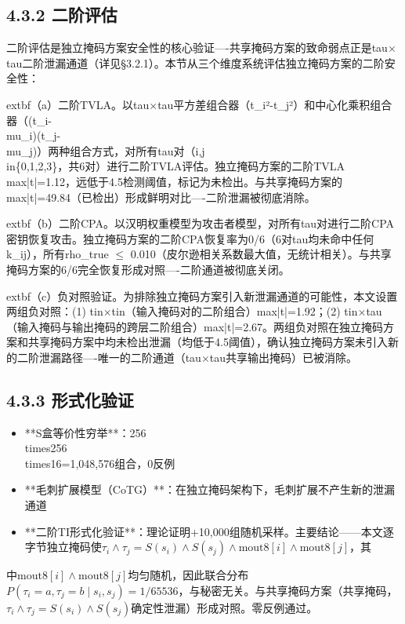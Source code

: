 \documentclass[journal]{IEEEtran}
\begin{document}
\subsection{4.3.2 二阶评估}

二阶评估是独立掩码方案安全性的核心验证----共享掩码方案的致命弱点正是tau$\times$tau二阶泄漏通道（详见§3.2.1）。本节从三个维度系统评估独立掩码方案的二阶安全性：

	extbf{（a）二阶TVLA}。以tau$\times$tau平方差组合器（t\_i²-t\_j²）和中心化乘积组合器（(t\_i-\\mu\_i)(t\_j-\\mu\_j)）两种组合方式，对所有tau对（i,j\\in\{0,1,2,3\}，共6对）进行二阶TVLA评估。独立掩码方案的二阶TVLA max|t|=1.12，远低于4.5检测阈值，标记为未检出。与共享掩码方案的max|t|=49.84（已检出）形成鲜明对比----二阶泄漏被彻底消除。

	extbf{（b）二阶CPA}。以汉明权重模型为攻击者模型，对所有tau对进行二阶CPA密钥恢复攻击。独立掩码方案的二阶CPA恢复率为0/6（6对tau均未命中任何k\_ij），所有rho\_true $\leq$ 0.010（皮尔逊相关系数最大值，无统计相关）。与共享掩码方案的6/6完全恢复形成对照----二阶通道被彻底关闭。

	extbf{（c）负对照验证}。为排除独立掩码方案引入新泄漏通道的可能性，本文设置两组负对照：(1) tin$\times$tin（输入掩码对的二阶组合）max|t|=1.92；(2) tin$\times$tau（输入掩码与输出掩码的跨层二阶组合）max|t|=2.67。两组负对照在独立掩码方案和共享掩码方案中均未检出泄漏（均低于4.5阈值），确认独立掩码方案未引入新的二阶泄漏路径----唯一的二阶通道（tau$\times$tau共享输出掩码）已被消除。

\subsection{4.3.3 形式化验证}

\begin{itemize}
\item **S盒等价性穷举**：256\\times256\\times16=1,048,576组合，0反例
\item **毛刺扩展模型（CoTG）**：在独立掩码架构下，毛刺扩展不产生新的泄漏通道
\item **二阶TI形式化验证**：理论证明+10,000组随机采样。主要结论——本文逐字节独立掩码使$\tau_i \wedge \tau_j = S(s_i) \wedge S(s_j) \wedge \text{mout8}[i] \wedge \text{mout8}[j]$，其
\end{itemize}中$\text{mout8}[i] \wedge \text{mout8}[j]$均匀随机，因此联合分布$P(\tau_i=a, \tau_j=b \mid s_i, s_j) = 1/65536$，与秘密无关。与共享掩码方案（共享掩码，$\tau_i \wedge \tau_j = S(s_i) \wedge S(s_j)$确定性泄漏）形成对照。零反例通过。
\end{document}
